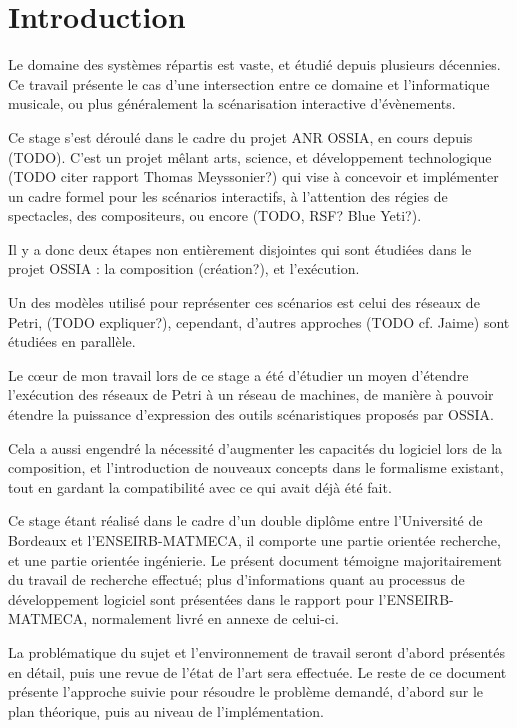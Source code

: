 \chapter*{Introduction}
Le domaine des systèmes répartis est vaste, et étudié depuis plusieurs décennies. Ce travail présente le cas d'une intersection entre ce domaine et l'informatique musicale, ou plus généralement la scénarisation interactive d'évènements. 

Ce stage s'est déroulé dans le cadre du projet ANR \ac{OSSIA}, en cours depuis (TODO). C'est un projet mêlant arts, science, et développement technologique (TODO citer rapport Thomas Meyssonier?) qui vise à concevoir et implémenter un cadre formel pour les scénarios interactifs, à l'attention des régies de spectacles, des compositeurs, ou encore (TODO, RSF? Blue Yeti?). 

Il y a donc deux étapes non entièrement disjointes qui sont étudiées dans le projet \ac{OSSIA} : la composition (création?), et l'exécution.

Un des modèles utilisé pour représenter ces scénarios est celui des réseaux de Petri, (TODO expliquer?), cependant, d'autres approches (TODO cf. Jaime) sont étudiées en parallèle. 

Le cœur de mon travail lors de ce stage a été d'étudier un moyen d'étendre l'exécution des réseaux de Petri à un réseau de machines, de manière à pouvoir étendre la puissance d'expression des outils scénaristiques proposés par \ac{OSSIA}.

Cela a aussi engendré la nécessité d'augmenter les capacités du logiciel lors de la composition, et l'introduction de nouveaux concepts dans le formalisme existant, tout en gardant la compatibilité avec ce qui avait déjà été fait.

Ce stage étant réalisé dans le cadre d'un double diplôme entre l'Université de Bordeaux et l'ENSEIRB-MATMECA, il comporte une partie orientée recherche, et une partie orientée ingénierie. Le présent document témoigne majoritairement du travail de recherche effectué; plus d'informations quant au processus de développement logiciel sont présentées dans le rapport pour l'ENSEIRB-MATMECA, normalement livré en annexe de celui-ci.

La problématique du sujet et l'environnement de travail seront d'abord présentés en détail, puis une revue de l'état de l'art sera effectuée. Le reste de ce document présente l'approche suivie pour résoudre le problème demandé, d'abord sur le plan théorique, puis au niveau de l'implémentation.
